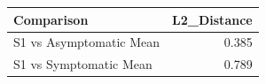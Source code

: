 
\begin{tabular}{lr}
\toprule
Comparison & L2\_Distance\\
\midrule
S1 vs Asymptomatic Mean & 0.385\\
S1 vs Symptomatic Mean & 0.789\\
\bottomrule
\end{tabular}
